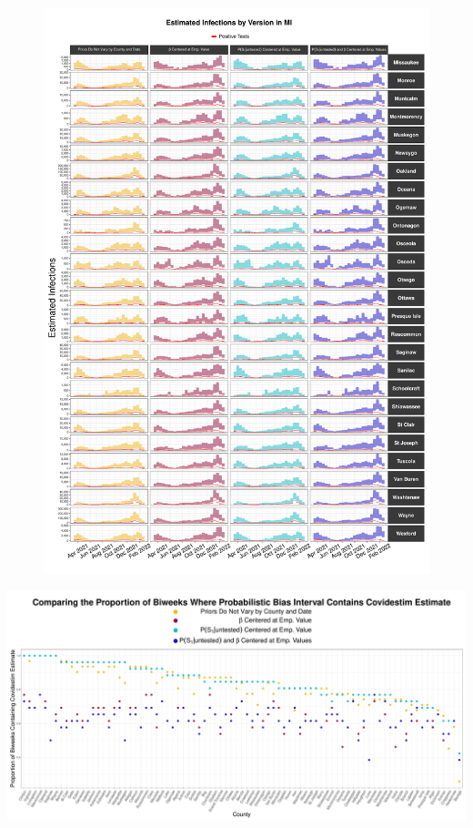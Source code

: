 \documentclass[12pt,twoside]{smiththesis}
\begin{document}
\begin{figure}
\includegraphics[width=1\linewidth]{figure/mi3_pb_compared_to_observed} \caption{\label{fig:pb_versions_mi}}\label{fig:unnamed-chunk-25-3}
\end{figure}
\includegraphics[width=1\linewidth]{figure/mi_pb_compared_to_covidestim_proportions}
\end{document}
